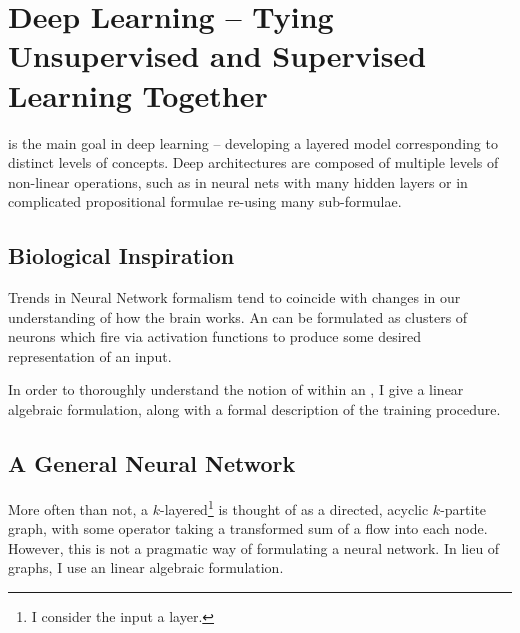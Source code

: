 
\chapter{Deep Learning -- Tying Unsupervised and Supervised Learning Together}

 is the main goal in deep learning -- developing a layered model corresponding to distinct levels of concepts. Deep architectures are composed of multiple levels of non-linear operations, such as in neural nets with many hidden layers or in complicated propositional formulae re-using many sub-formulae\citep{Bengio2009LearningDeep}.

\section{Biological Inspiration}

Trends in Neural Network formalism tend to coincide with changes in our understanding of how the brain works. An \ann{} can be formulated as clusters of neurons which fire via activation functions to produce some desired representation of an input.

In order to thoroughly understand the notion of \dl{} within an \ann{}, I give a linear algebraic formulation, along with a formal description of the training procedure.

\section{A General Neural Network}

More often than not, a $k$-layered\footnote{I consider the input a layer.} \ann{} is thought of as a directed, acyclic $k$-partite graph, with some operator taking a transformed sum of a flow into each node. However, this is not a pragmatic way of formulating a neural network. In lieu of graphs, I use an  linear algebraic formulation. 

